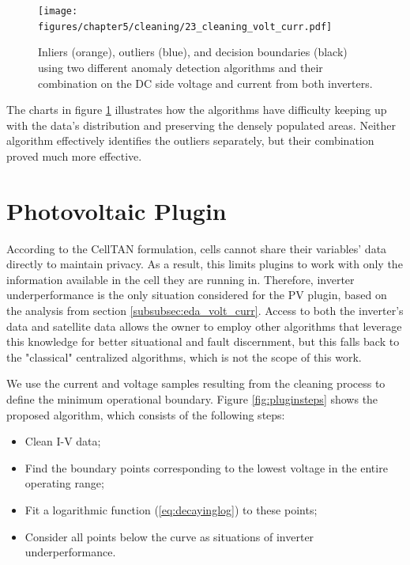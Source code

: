 \begin{figure}[h!]
    \centering
    \texttt{[image: figures/chapter5/cleaning/23\_cleaning\_volt\_curr.pdf]}
    \caption{Inliers (orange), outliers (blue), and decision boundaries (black) using two different anomaly detection algorithms and their combination on the DC side voltage and current from both inverters.}
    \label{fig:clean_volt_curr}
\end{figure}

The charts in figure \ref{fig:clean_volt_curr} illustrates how the algorithms have difficulty keeping up with the data's distribution and preserving the densely populated areas. Neither algorithm effectively identifies the outliers separately, but their combination proved much more effective.

\section{Photovoltaic Plugin} \label{sec:pvplugin}

According to the CellTAN formulation, cells cannot share their variables' data directly to maintain privacy. As a result, this limits plugins to work with only the information available in the cell they are running in. Therefore, inverter underperformance is the only situation considered for the PV plugin, based on the analysis from section \ref{subsubsec:eda_volt_curr}. Access to both the inverter's data and satellite data allows the owner to employ other algorithms that leverage this knowledge for better situational and fault discernment, but this falls back to the "classical" centralized algorithms, which is not the scope of this work.

We use the current and voltage samples resulting from the cleaning process to define the minimum operational boundary. Figure \ref{fig:pluginsteps} shows the proposed algorithm, which consists of the following steps:

\begin{itemize}
	\item Clean I-V data;
	\item Find the boundary points corresponding to the lowest voltage in the entire operating range;
	\item Fit a logarithmic function (\ref{eq:decayinglog}) to these points;
	\item Consider all points below the curve as situations of inverter underperformance.
\end{itemize}


